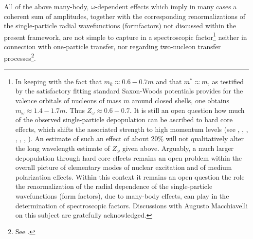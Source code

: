 All of the above many-body, $\omega$-dependent effects which imply in many cases a coherent sum of amplitudes, together with the corresponding renormalizations of the single-particle radial wavefunctions (formfactors) not discussed within the present framework, are not simple to capture in a spectroscopic factor\footnote{In keeping with the fact that $m_k\approx 0.6-0.7 m$ and that $m^*\approx m$, as testified by the satisfactory fitting standard Saxon-Woods potentials provides for the valence orbitals of nucleons of mass $m$ around closed shells, one obtains $m_\omega\approx 1.4-1.7 m$. Thus $Z_\omega \approx 0.6-0.7$. It is still an open question how much of the observed single-particle depopulation can be ascribed to hard core effects, which shifts the associated strength to high momentum levels (see \cite{Dickhoff:05}, \cite{Jenning:11}, \cite{Kramer:01}, \cite{Barbieri:09}, \cite{Schiffer:12}, \cite{Duguet:12}, \cite{Furnstahl:10}).  An estimate of such an effect of about 20\% will not qualitatively alter the long wavelength estimate of $Z_\omega$ given above. Arguably, a much larger depopulation through hard core effects remains an open problem within the overall picture of elementary modes of nuclear excitation and of medium polarization effects. Within this context it remains an open question  the role   the renormalization of the radial dependence of the single-particle wavefunctions (form factors), due to many-body effects, can play in the determination of spectroscopic factors. Discussions with Augusto Macchiavelli on this subject are gratefully acknowledged.} neither in connection with one-particle transfer, nor regarding two-nucleon transfer processes\footnote{See \cite{Barranco:05,Barranco:99}.}. 






